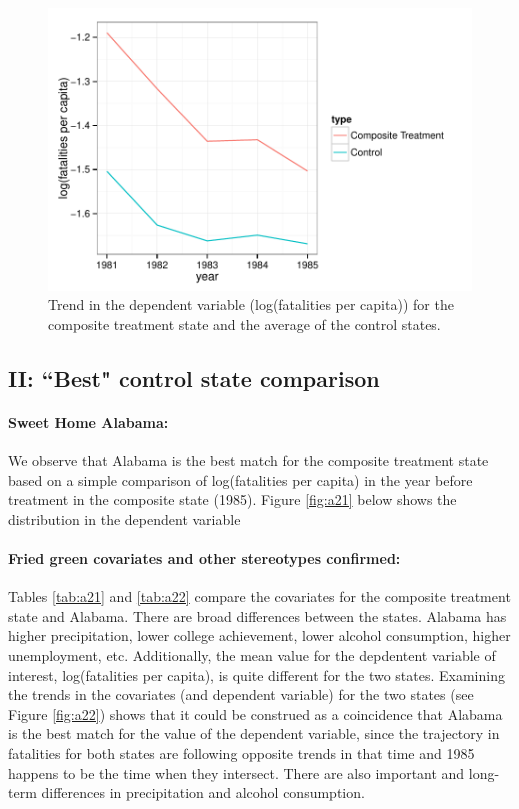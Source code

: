 \documentclass[letterpaper, 12pt]{article}
\begin{document}
\begin{figure}[htbp]
\begin{center}
\includegraphics{img-p2b-logfatTrend.pdf}
\caption{Trend in the dependent variable (log(fatalities per capita)) for the composite treatment state and the average of the control states.}
\label{fig:a11}
\end{center}
\end{figure}


\subsection{II: ``Best" control state comparison}

\paragraph{Sweet Home Alabama:} 
We observe that Alabama is the best match for the composite treatment state based on a simple comparison of log(fatalities per capita) in the year before treatment in the composite state (1985).  Figure \ref{fig:a21} below shows the distribution in the dependent variable 

\paragraph{Fried green covariates and other stereotypes confirmed:}
Tables \ref{tab:a21} and \ref{tab:a22} compare the covariates for the composite treatment state and Alabama.  There are broad differences between the states.  Alabama has higher precipitation, lower college achievement, lower alcohol consumption, higher unemployment, etc.  Additionally, the mean value for the depdentent variable of interest, log(fatalities per capita), is quite different for the two states.  Examining the trends in the covariates (and dependent variable) for the two states (see Figure \ref{fig:a22}) shows that it could be construed as a coincidence that Alabama is the best match for the value of the dependent variable, since the trajectory in fatalities for both states are following opposite trends in that time and 1985 happens to be the time when they intersect.  There are also important and long-term differences in precipitation and alcohol consumption.  
\end{document}
